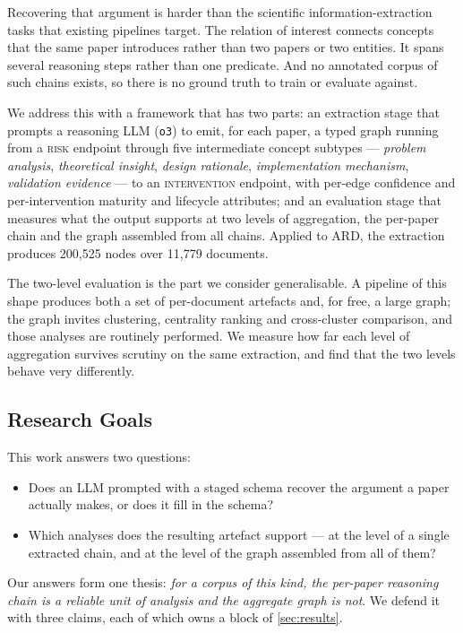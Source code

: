 \documentclass[10pt,twocolumn,letterpaper]{article}
\begin{document}
Recovering that argument is harder than the scientific information-extraction tasks that
existing pipelines target. The relation of interest connects concepts that the same
paper introduces rather than two papers or two entities. It spans several reasoning
steps rather than one predicate. And no annotated corpus of such chains exists, so there
is no ground truth to train or evaluate against.

We address this with a framework that has two parts: an extraction stage that prompts a
reasoning LLM (\texttt{o3}) to emit, for each paper, a typed graph running from a
\textsc{risk} endpoint through five intermediate concept subtypes --- \emph{problem
analysis}, \emph{theoretical insight}, \emph{design rationale}, \emph{implementation
mechanism}, \emph{validation evidence} --- to an \textsc{intervention} endpoint, with
per-edge confidence and per-intervention maturity and lifecycle attributes; and an
evaluation stage that measures what the output supports at two levels of aggregation,
the per-paper chain and the graph assembled from all chains. Applied to ARD, the
extraction produces 200{,}525 nodes over 11{,}779 documents.

The two-level evaluation is the part we consider generalisable. A pipeline of this shape
produces both a set of per-document artefacts and, for free, a large graph; the graph
invites clustering, centrality ranking and cross-cluster comparison, and those analyses
are routinely performed. We measure how far each level of aggregation survives scrutiny
on the same extraction, and find that the two levels behave very differently.

\subsection{Research Goals}
\label{sec:goals}

This work answers two questions:

\begin{itemize}
\setlength{\itemsep}{1pt}
\item Does an LLM prompted with a staged schema recover the argument a paper actually
makes, or does it fill in the schema?
\item Which analyses does the resulting artefact support --- at the level of a single
extracted chain, and at the level of the graph assembled from all of them?
\end{itemize}

Our answers form one thesis: \emph{for a corpus of this kind, the per-paper reasoning
chain is a reliable unit of analysis and the aggregate graph is not}. We defend it with
three claims, each of which owns a block of \cref{sec:results}.
\end{document}
